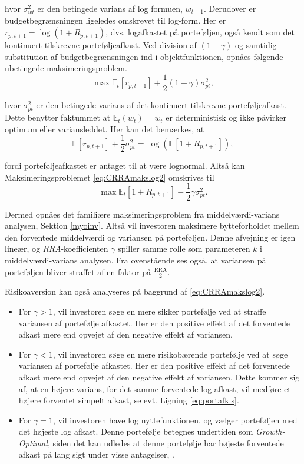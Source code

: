 \documentclass[
  a4paper,
  oneside]{memoir}
\begin{document}
hvor \(\sigma_{wt}^2\) er den betingede varians af log formuen, \(w_{t+1}\). Derudover er budgetbegrænsningen ligeledes omskrevet til log-form. Her er \(r_{p,t+1}=\log(1+R_{p,t+1})\), dvs. logafkastet på porteføljen, også kendt som det kontinuert tilskrevne porteføljeafkast. Ved division af \((1-\gamma)\) og samtidig substitution af budgetbegrænsningen ind i objektfunktionen, opnåes følgende ubetingede maksimeringsproblem.
\begin{equation}
\max\mathbb{E}_t\left[r_{p,t+1}\right] + \frac{1}{2}(1-\gamma)\sigma_{pt}^2, \label{eq:CRRAmakslog2}
\end{equation}

hvor \(\sigma_{pt}^2\) er den betingede varians af det kontinuert tilskrevne porteføljeafkast. Dette benytter faktummet at \(\mathbb{E}_t(w_t)=w_t\) er deterministisk og ikke påvirker optimum eller variansleddet. Her kan det bemærkes, at
\begin{equation}
\mathbb{E}\left[r_{p,t+1}\right]+\frac{1}{2}\sigma_{pt}^2=\log(\mathbb{E}\left[1+R_{p,t+1}\right]), \label{eq:portafkls}
\end{equation}

fordi porteføljeafkastet er antaget til at være lognormal. Altså kan Maksimeringsproblemet \eqref{eq:CRRAmakslog2} omskrives til
\begin{equation}
\max\mathbb{E}_t[1+R_{p,t+1}] - \frac{1}{2}\gamma\sigma_{pt}^2. \label{eq:CRRAmakslog3}
\end{equation}

Dermed opnåes det familiære maksimeringsproblem fra middelværdi-varians analysen, Sektion \ref{myoinv}. Altså vil investoren maksimere bytteforholdet mellem den forventede middelværdi og variansen på porteføljen. Denne afvejning er igen lineær, og \emph{RRA}-koefficienten \(\gamma\) spiller samme rolle som parameteren \(k\) i middelværdi-varians analysen. Fra ovenstående ses også, at variansen på porteføljen bliver straffet af en faktor på \(\tfrac{\text{RRA}}{2}\).

Risikoaversion kan også analyseres på baggrund af \eqref{eq:CRRAmakslog2}.

\begin{itemize}
\item
  For \(\gamma>1\), vil investoren søge en mere sikker portefølje ved at straffe variansen af portefølje afkastet. Her er den positive effekt af det forventede afkast mere end opvejet af den negative effekt af variansen.
\item
  For \(\gamma<1\), vil investoren søge en mere risikobærende portefølje ved at søge variansen af portefølje afkastet. Her er den positive effekt af det forventede afkast mere end opvejet af den negative effekt af variansen. Dette kommer sig af, at en højere varians, for det samme forventede log afkast, vil medføre et højere forventet simpelt afkast, se evt. Ligning \eqref{eq:portafkls}.
\item
  For \(\gamma=1\), vil investoren have log nyttefunktionen, og vælger porteføljen med det højeste log afkast. Denne portefølje betegnes undertiden som \emph{Growth-Optimal}, siden det kan udledes at denne portefølje har højeste forventede afkast på lang sigt under visse antagelser, \citep{Kelly1956}.
\end{itemize}
\end{document}
